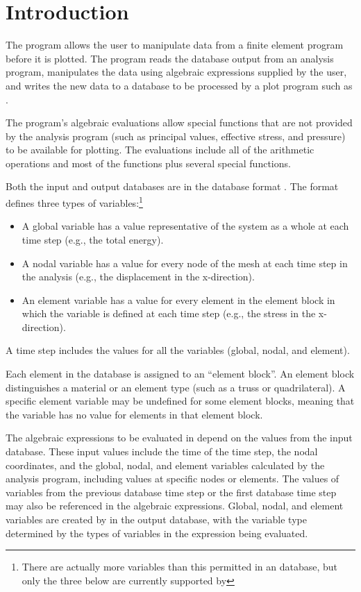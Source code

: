 \chapter{Introduction} \label{chap:intro}

The \caps{\PROGRAM} program allows the user to manipulate data from a
finite element program before it is plotted. The program reads the
database output from an analysis program, manipulates the data using 
algebraic expressions supplied by the user, and writes the new data to a
database to be processed by a plot program such as 
\cite{bib:blot}.

The program's algebraic evaluations allow special functions that are not
provided by the analysis program (such as principal values, effective
stress, and pressure) to be available for plotting. The evaluations
include all of the  arithmetic operations and most of the
 functions plus several special functions.

Both the input and output databases are in the \exo{} database
format \cite{bib:exodus}. The \exo{} format defines three types of
variables:\footnote{There are actually more variables than this
  permitted in an \exo{} database, but only the three below are
  currently supported by \caps{\PROGRAM}}
\setlength{\itemsep}{\medskipamount} \begin{itemize}
\item
A global variable has a value representative of the system as a whole
at each time step (e.g., the total energy).
\item
A nodal variable has a value for every node of the mesh at each time
step in the analysis (e.g., the displacement in the x-direction).
\item
An element variable has a value for every element in the element block
in which the variable is defined at each time step (e.g., the stress in the
x-direction).  

\end{itemize}

A time step includes the values for all the variables (global, nodal, and element).

Each element in the database is assigned to an ``element block''. An
element block distinguishes a material or an element type (such as a
truss or quadrilateral). A specific element variable may be undefined
for some element blocks, meaning that the variable has no value for
elements in that element block.

The algebraic expressions to be evaluated in \caps{\PROGRAM} depend on
the values from the input database. These input values include the time
of the time step, the nodal coordinates, and the global, nodal,
and element variables calculated by the analysis program, including
values at specific nodes or elements. The values of variables from the
previous database time step or the first database time step may also be
referenced in the algebraic expressions. Global, nodal, and
element variables are created by \caps{\PROGRAM} in the output database,
with the variable type determined by the types of variables in the
expression being evaluated.

